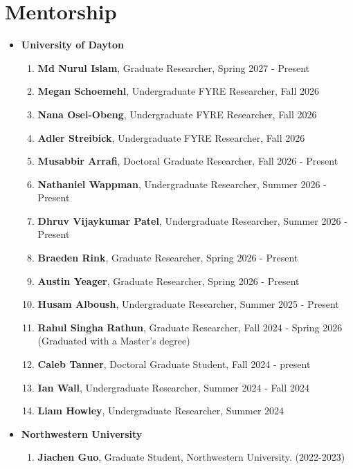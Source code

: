 \documentclass[11pt, letterpaper]{article}
\begin{document}
\section{Mentorship}
    \begin{itemize}[itemsep=-1pt, topsep=2pt]
        \item \textbf{University of Dayton}
        \begin{enumerate}[label=\arabic*., itemsep=-1pt, topsep=2pt]
            \item \textbf{Md Nurul Islam}, Graduate Researcher, Spring 2027 - Present
            \item \textbf{Megan Schoemehl}, Undergraduate FYRE Researcher, Fall 2026
            \item \textbf{Nana Osei-Obeng}, Undergraduate FYRE Researcher, Fall 2026
            \item \textbf{Adler Streibick}, Undergraduate FYRE Researcher, Fall 2026
            \item \textbf{Musabbir Arrafi}, Doctoral Graduate Researcher, Fall 2026 - Present
            \item \textbf{Nathaniel Wappman}, Undergraduate Researcher, Summer 2026 - Present
            \item \textbf{Dhruv Vijaykumar Patel}, Undergraduate Researcher, Summer 2026 - Present
            \item \textbf{Braeden Rink}, Graduate Researcher, Spring 2026 - Present
            \item \textbf{Austin Yeager}, Graduate Researcher, Spring 2026 - Present
            \item \textbf{Husam Alboush}, Undergraduate Researcher, Summer 2025 - Present
            \item \textbf{Rahul Singha Rathun}, Graduate Researcher, Fall 2024 - Spring 2026 (Graduated with a Master's degree)
            \item \textbf{Caleb Tanner}, Doctoral Graduate Student, Fall 2024 - present
            \item \textbf{Ian  Wall}, Undergraduate Researcher, Summer 2024 - Fall 2024
            \item \textbf{Liam Howley}, Undergraduate Researcher, Summer 2024
        \end{enumerate}
        \item \textbf{Northwestern University}
        \begin{enumerate}
            \item \textbf{Jiachen Guo}, Graduate Student, Northwestern University. (2022-2023)

\end{enumerate}
\end{itemize}
\end{document}
